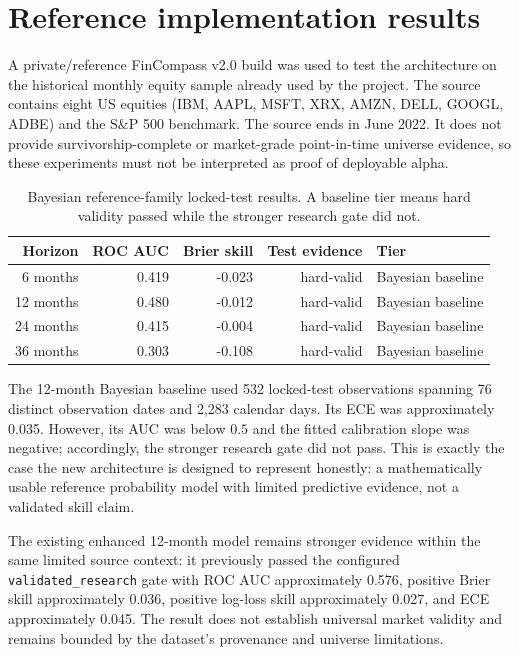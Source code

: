 \documentclass[11pt]{article}
\begin{document}
\section{Reference implementation results}
A private/reference FinCompass v2.0 build was used to test the architecture on the historical monthly equity sample already used by the project. The source contains eight US equities (IBM, AAPL, MSFT, XRX, AMZN, DELL, GOOGL, ADBE) and the S\&P 500 benchmark. The source ends in June 2022. It does not provide survivorship-complete or market-grade point-in-time universe evidence, so these experiments must not be interpreted as proof of deployable alpha.

\begin{table}[ht]
\centering
\caption{Bayesian reference-family locked-test results. A baseline tier means hard validity passed while the stronger research gate did not.}
\begin{tabular}{rrrrl}
\toprule
Horizon & ROC AUC & Brier skill & Test evidence & Tier\\
\midrule
6 months  & 0.419 & -0.023 & hard-valid & Bayesian baseline\\
12 months & 0.480 & -0.012 & hard-valid & Bayesian baseline\\
24 months & 0.415 & -0.004 & hard-valid & Bayesian baseline\\
36 months & 0.303 & -0.108 & hard-valid & Bayesian baseline\\
\bottomrule
\end{tabular}
\end{table}

The 12-month Bayesian baseline used 532 locked-test observations spanning 76 distinct observation dates and 2,283 calendar days. Its ECE was approximately 0.035. However, its AUC was below $0.5$ and the fitted calibration slope was negative; accordingly, the stronger research gate did not pass. This is exactly the case the new architecture is designed to represent honestly: a mathematically usable reference probability model with limited predictive evidence, not a validated skill claim.

The existing enhanced 12-month model remains stronger evidence within the same limited source context: it previously passed the configured \texttt{validated\_research} gate with ROC AUC approximately 0.576, positive Brier skill approximately 0.036, positive log-loss skill approximately 0.027, and ECE approximately 0.045. The result does not establish universal market validity and remains bounded by the dataset's provenance and universe limitations.
\end{document}

